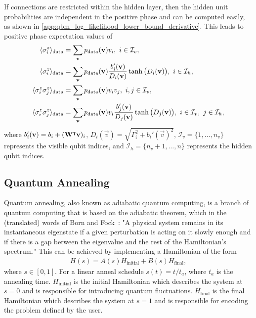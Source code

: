 If connections are restricted within the hidden layer, then the hidden unit probabilities are independent in the positive phase and can be computed easily, as shown in \cref{app:qbm_log_likelihood_lower_bound_derivative}.
This leads to positive phase expectation values of
\begin{align}
\begin{split}
    \langle \sigma_i^z \rangle_\text{data}
        &= \sum_{\mathbf{v}} p_{\text{data}}(\mathbf{v}) v_i,
        \ i \in \mathcal{I}_v, \\
    \langle \sigma_i^z \rangle_\text{data}
        &= \sum_{\mathbf{v}} p_{\text{data}}(\mathbf{v}) \frac{b_i'(\mathbf{v})}{D_i(\mathbf{v})} \tanh\big(D_i(\mathbf{v})\big), \ i \in \mathcal{I}_h, \\
    \langle \sigma_i^z \sigma_j^z \rangle_\text{data}
        &= \sum_{\mathbf{v}} p_{\text{data}}(\mathbf{v}) v_i v_j,
        \ i, j \in \mathcal{I}_v, \\
    \langle \sigma_i^z \sigma_j^z \rangle_\text{data}
        &= \sum_{\mathbf{v}} p_{\text{data}}(\mathbf{v}) v_i \frac{b_j'(\mathbf{v})}{D_j(\mathbf{v})} \tanh\big(D_j(\mathbf{v})\big), \ i \in \mathcal{I}_v, \ j \in \mathcal{I}_h,
\end{split}
\end{align}
where \( b_i'(\mathbf{v}) = b_i + (\mathbf{W}^\intercal\mathbf{v})_i \), \( D_i(\vec{v}) = \sqrt{\Gamma_i^2 + b_i'(\vec{v})^2} \), \( \mathcal{I}_v = \{1, \dots, n_v\} \) represents the visible qubit indices, and \( \mathcal{I}_h = \{n_v + 1, \dots, n\} \) represents the hidden qubit indices.

\subsection{Quantum Annealing}\label{sec:quantum_annealing}
Quantum annealing, also known as adiabatic quantum computing, is a branch of quantum computing that is based on the adiabatic theorem, which in the (translated) words of Born and Fock~\cite{born_fock_1928}:
"A physical system remains in its instantaneous eigenstate if a given perturbation is acting on it slowly enough and if there is a gap between the eigenvalue and the rest of the Hamiltonian's spectrum."
This can be achieved by implementing a Hamiltonian of the form~\cite{qc_lecture_notes}
\begin{align}
    H(s) = A(s) H_{\text{initial}} + B(s) H_{\text{final}},
\end{align}
where \( s \in [0, 1] \).
For a linear anneal schedule \( s(t) = t / t_a \), where \( t_a \) is the annealing time.
\( H_{\text{initial}} \) is the initial Hamiltonian which describes the system at \( s = 0 \) and is responsible for introducing quantum fluctuations.
\( H_{\text{final}} \) is the final Hamiltonian which describes the system at \( s = 1 \) and is responsible for encoding the problem defined by the user.

